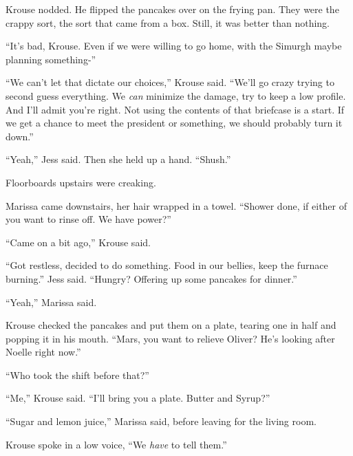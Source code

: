 Krouse nodded.  He flipped the pancakes over on the frying pan.  They were the crappy sort, the sort that came from a box.  Still, it was better than nothing.



``It's bad, Krouse.  Even if we were willing to go home, with the Simurgh maybe planning something-''



``We can't let that dictate our choices,'' Krouse said.  ``We'll go crazy trying to second guess everything.  We \emph{can} minimize the damage, try to keep a low profile.  And I'll admit you're right.  Not using the contents of that briefcase is a start.  If we get a chance to meet the president or something, we should probably turn it down.''



``Yeah,'' Jess said.  Then she held up a hand.  ``Shush.''



Floorboards upstairs were creaking.



Marissa came downstairs, her hair wrapped in a towel.  ``Shower done, if either of you want to rinse off.  We have power?''



``Came on a bit ago,'' Krouse said.



``Got restless, decided to do something.  Food in our bellies, keep the furnace burning.'' Jess said.  ``Hungry?  Offering up some pancakes for dinner.''



``Yeah,'' Marissa said.



Krouse checked the pancakes and put them on a plate, tearing one in half and popping it in his mouth.  ``Mars, you want to relieve Oliver?  He's looking after Noelle right now.''



``Who took the shift before that?''



``Me,'' Krouse said.  ``I'll bring you a plate.  Butter and Syrup?''



``Sugar and lemon juice,'' Marissa said, before leaving for the living room.



Krouse spoke in a low voice, ``We \emph{have} to tell them.''



